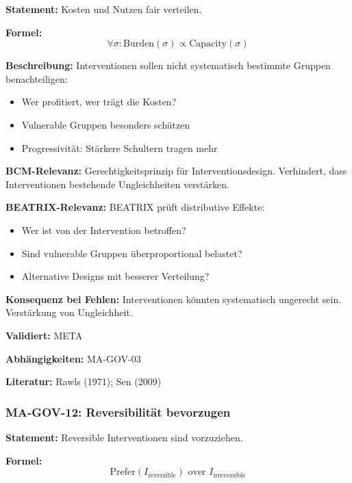 \textbf{Statement:} Kosten und Nutzen fair verteilen.

\textbf{Formel:}
\begin{equation}
\forall \sigma: \text{Burden}(\sigma) \propto \text{Capacity}(\sigma)
\end{equation}

\textbf{Beschreibung:}
Interventionen sollen nicht systematisch bestimmte Gruppen benachteiligen:
\begin{itemize}
    \item Wer profitiert, wer trägt die Kosten?
    \item Vulnerable Gruppen besonders schützen
    \item Progressivität: Stärkere Schultern tragen mehr
\end{itemize}

\textbf{BCM-Relevanz:}
Gerechtigkeitsprinzip für Interventionsdesign. Verhindert, dass Interventionen bestehende Ungleichheiten verstärken.

\textbf{BEATRIX-Relevanz:}
BEATRIX prüft distributive Effekte:
\begin{itemize}
    \item Wer ist von der Intervention betroffen?
    \item Sind vulnerable Gruppen überproportional belastet?
    \item Alternative Designs mit besserer Verteilung?
\end{itemize}

\textbf{Konsequenz bei Fehlen:}
Interventionen könnten systematisch ungerecht sein. Verstärkung von Ungleichheit.

\textbf{Validiert:} META

\textbf{Abhängigkeiten:} MA-GOV-03

\textbf{Literatur:} Rawls (1971); Sen (2009)


\subsubsection*{MA-GOV-12: Reversibilität bevorzugen}

\textbf{Statement:} Reversible Interventionen sind vorzuziehen.

\textbf{Formel:}
\begin{equation}
\text{Prefer}(I_{\text{reversible}}) \text{ over } I_{\text{irreversible}}
\end{equation}

